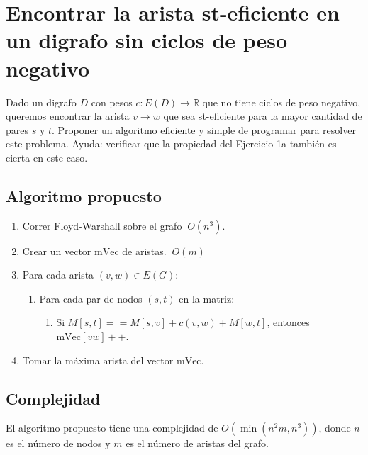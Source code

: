 \documentclass{article}
\begin{document}
\section*{Encontrar la arista st-eficiente en un digrafo sin ciclos de peso negativo}

Dado un digrafo \( D \) con pesos \( c : E(D) \rightarrow \mathbb{R} \) que no tiene ciclos de peso negativo, queremos encontrar la arista \( v \rightarrow w \) que sea st-eficiente para la mayor cantidad de pares \( s \) y \( t \). Proponer un algoritmo eficiente y simple de programar para resolver este problema. Ayuda: verificar que la propiedad del Ejercicio 1a también es cierta en este caso.

\subsection*{Algoritmo propuesto}

\begin{enumerate}
    \item Correr Floyd-Warshall sobre el grafo \(\ O(n^{3})\).
    \item Crear un vector \( \text{mVec} \) de aristas. \(\ O(m)\)
    \item Para cada arista \( (v,w) \in E(G) \):
    \begin{enumerate}
        \item Para cada par de nodos \( (s,t) \) en la matriz:
        \begin{enumerate}
            \item Si \( M[s,t] == M[s,v] + c(v,w) + M[w,t] \), entonces \( \text{mVec}[vw]++ \).
        \end{enumerate}
    \end{enumerate}
    \item Tomar la máxima arista del vector \( \text{mVec} \).
\end{enumerate}

\subsection*{Complejidad}

El algoritmo propuesto tiene una complejidad de \( O(\min(n^{2}m, n^{3})) \), donde \( n \) es el número de nodos y \( m \) es el número de aristas del grafo.
\end{document}
